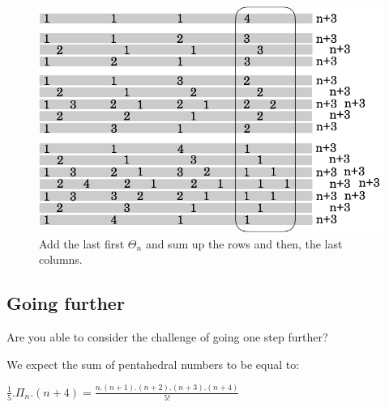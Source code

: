 \begin{figure}[h]
\begin{center}
        \includegraphics[scale=0.36]{FiguresArithmetic/appTetrahedral5}
        \caption{Add the last first $\Theta_n$ and sum up the rows and then, the last columns.}
        \label{fig:Tetrahedral5}
\end{center}
\end{figure}


\subsection{Going further}

Are you able to consider the challenge of going one step further?

We expect the sum of pentahedral numbers to be equal to:

$\frac{1}{5}.\Pi_n.(n+4) = \frac{n.(n+1).(n+2).(n+3).(n+4)}{5!}$




